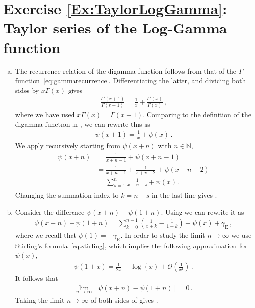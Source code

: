 \section*{Exercise \ref{Ex:TaylorLogGamma}: Taylor series of the Log-Gamma function}
\label{Sol:TaylorLogGamma}
\begin{enumerate}[a)]
\item The recurrence relation of the digamma function follows from that of the $\Gamma$ function~\eqref{eq:gammarecurrence}. 
Differentiating the latter, and dividing both sides by $x \Gamma(x)$ gives
\begin{align}
\frac{ \Gamma'(x+1)}{\Gamma(x+1)} = \frac{1}{x} + \frac{\Gamma'(x)}{\Gamma(x)} \,,
\end{align}
where we have used $x \Gamma(x) = \Gamma(x+1)$.
Comparing to the definition of the digamma function in , we can rewrite this as
\begin{align} \label{eq:psirecurrence}
\psi(x+1) = \frac{1}{x} + \psi(x) \,.
\end{align}
We apply  recursively starting from $\psi(x+n)$ with $n\in\mathbb{N}$,
\begin{align}
\begin{aligned}
\psi(x+n) & = \frac{1}{x+n-1} + \psi(x+n-1) \\
& = \frac{1}{x+n-1} + \frac{1}{x+n-2} + \psi(x+n-2)  \\
& = \sum_{s=1}^n \frac{1}{x+n-s} + \psi(x) \,.
\end{aligned} 
\end{align}
Changing the summation index to $k=n-s$ in the last line gives .

\smallskip 

\item Consider the difference $\psi(x+n) - \psi(1+n)$. Using  we can rewrite it as
\begin{align} \label{eq:psidiff}
\psi(x+n) - \psi(1+n) = \sum_{k=0}^{n-1} \left(\frac{1}{x+k} - \frac{1}{1+k}\right) + \psi(x) + \gamma_{\text{E}} \,,
\end{align}
where we recall that $\psi(1) = - \gamma_{\text{E}}$. In order to study the limit $n \to \infty$ we use Stirling's formula~\eqref{eq:stirling}, which implies the following approximation for $\psi(x)$,
\begin{align}
\psi(1+x) = \frac{1}{2 x} + \log(x) + \mathcal{O}\left(\frac{1}{x^2}\right) \,.
\end{align}
It follows that 
\begin{align}
\lim_{n\to \infty} \left[ \psi(x+n) - \psi(1+n) \right] = 0 \,.
\end{align}
Taking the limit $n\to \infty$ of both sides of  gives .


\end{enumerate}
